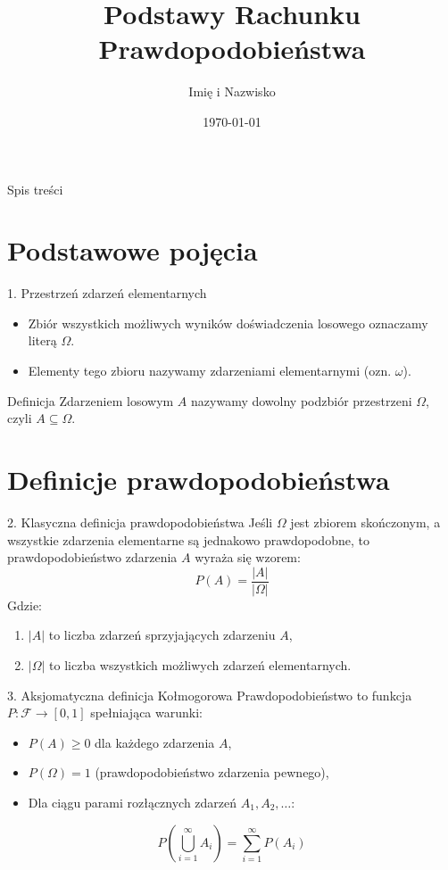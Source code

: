 \documentclass{beamer}
\title{Podstawy Rachunku Prawdopodobieństwa}
\author{Imię i Nazwisko}
\date{\today}
\begin{document}
\begin{frame}
\titlepage
\end{frame}

\begin{frame}{Spis treści}
\tableofcontents
\end{frame}

\section{Podstawowe pojęcia}

\begin{frame}{1. Przestrzeń zdarzeń elementarnych}
\begin{itemize}
    \item Zbiór wszystkich możliwych wyników doświadczenia losowego oznaczamy literą $\Omega$.
    \item Elementy tego zbioru nazywamy zdarzeniami elementarnymi (ozn. $\omega$).
\end{itemize}
\begin{block}{Definicja}
Zdarzeniem losowym $A$ nazywamy dowolny podzbiór przestrzeni $\Omega$, czyli $A \subseteq \Omega$.
\end{block}
\end{frame}

\section{Definicje prawdopodobieństwa}

\begin{frame}{2. Klasyczna definicja prawdopodobieństwa}
Jeśli $\Omega$ jest zbiorem skończonym, a wszystkie zdarzenia elementarne są jednakowo prawdopodobne, to prawdopodobieństwo zdarzenia $A$ wyraża się wzorem:
\begin{equation}
P(A) = \frac{|A|}{|\Omega|}
\end{equation}
Gdzie:
\begin{enumerate}
    \item $|A|$ to liczba zdarzeń sprzyjających zdarzeniu $A$,
    \item $|\Omega|$ to liczba wszystkich możliwych zdarzeń elementarnych.
\end{enumerate}
\end{frame}

\begin{frame}{3. Aksjomatyczna definicja Kołmogorowa}
Prawdopodobieństwo to funkcja $P: \mathcal{F} \to [0,1]$ spełniająca warunki:
\begin{itemize}
    \item $P(A) \ge 0$ dla każdego zdarzenia $A$,
    \item $P(\Omega) = 1$ (prawdopodobieństwo zdarzenia pewnego),
    \item Dla ciągu parami rozłącznych zdarzeń $A_1, A_2, \dots$:
\end{itemize}
\begin{equation}
P\left(\bigcup_{i=1}^\infty A_i\right) = \sum_{i=1}^\infty P(A_i)
\end{equation}
\end{frame}
\end{document}
